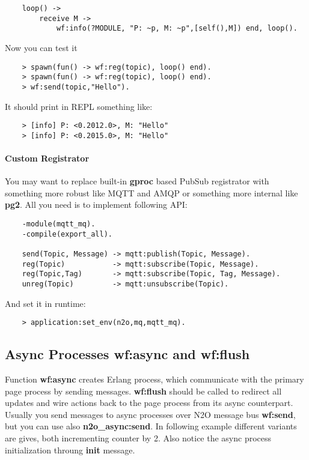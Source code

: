 \vspace{1\baselineskip}
\begin{lstlisting}
    loop() ->
        receive M ->
            wf:info(?MODULE, "P: ~p, M: ~p",[self(),M]) end, loop().
\end{lstlisting}

Now you can test it

\begin{lstlisting}
    > spawn(fun() -> wf:reg(topic), loop() end).
    > spawn(fun() -> wf:reg(topic), loop() end).
    > wf:send(topic,"Hello").
\end{lstlisting}

It should print in REPL something like:

\begin{lstlisting}
    > [info] P: <0.2012.0>, M: "Hello"
    > [info] P: <0.2015.0>, M: "Hello"
\end{lstlisting}

\paragraph{\bf Custom Registrator}

You may want to replace built-in {\bf gproc} based PubSub registrator
with something more robust like MQTT and AMQP or something more
internal like {\bf pg2}. All you need is to implement following API:

\vspace{1\baselineskip}
\begin{lstlisting}
    -module(mqtt_mq).
    -compile(export_all).

    send(Topic, Message) -> mqtt:publish(Topic, Message).
    reg(Topic)           -> mqtt:subscribe(Topic, Message).
    reg(Topic,Tag)       -> mqtt:subscribe(Topic, Tag, Message).
    unreg(Topic)         -> mqtt:unsubscribe(Topic).
\end{lstlisting}
\vspace{1\baselineskip}

And set it in runtime:

\vspace{1\baselineskip}
\begin{lstlisting}
    > application:set_env(n2o,mq,mqtt_mq).
\end{lstlisting}

\subsection{Async Processes {\bf wf:async} and {\bf wf:flush}}
Function {\bf wf:async} creates Erlang process, which communicate with the primary page
process by sending messages. {\bf wf:flush} should be called to redirect all updates and
wire actions back to the page process from its async counterpart.
Usually you send messages to async processes over N2O
message bus {\bf wf:send}, but you can use also {\bf n2o\_async:send}. In following
example different variants are gives, both incrementing counter by 2. Also notice
the async process initialization throung {\bf init} message.

